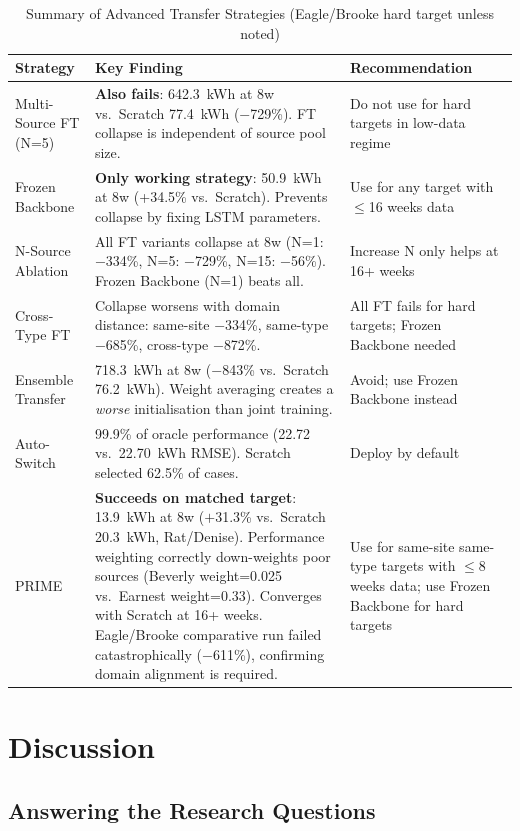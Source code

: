 \documentclass[12pt,a4paper]{report}
\begin{document}
\begin{table}[H]
\centering
\caption{Summary of Advanced Transfer Strategies (Eagle/Brooke hard target unless noted)}
\small
\begin{tabular}{p{3.0cm}p{5.5cm}p{5cm}}
\toprule
\textbf{Strategy} & \textbf{Key Finding} & \textbf{Recommendation} \\
\midrule
Multi-Source FT (N=5) & \textbf{Also fails}: 642.3~kWh at 8w vs.\ Scratch 77.4~kWh ($-$729\%). FT collapse is independent of source pool size. & Do not use for hard targets in low-data regime \\
\midrule
Frozen Backbone & \textbf{Only working strategy}: 50.9~kWh at 8w (+34.5\% vs.\ Scratch). Prevents collapse by fixing LSTM parameters. & Use for any target with $\leq$16 weeks data \\
\midrule
N-Source Ablation & All FT variants collapse at 8w (N=1: $-$334\%, N=5: $-$729\%, N=15: $-$56\%). Frozen Backbone (N=1) beats all. & Increase N only helps at 16+ weeks \\
\midrule
Cross-Type FT & Collapse worsens with domain distance: same-site $-$334\%, same-type $-$685\%, cross-type $-$872\%. & All FT fails for hard targets; Frozen Backbone needed \\
\midrule
Ensemble Transfer & 718.3~kWh at 8w ($-$843\% vs.\ Scratch 76.2~kWh). Weight averaging creates a \textit{worse} initialisation than joint training. & Avoid; use Frozen Backbone instead \\
\midrule
Auto-Switch & 99.9\% of oracle performance (22.72 vs.\ 22.70~kWh RMSE). Scratch selected 62.5\% of cases. & Deploy by default \\
\midrule
PRIME & \textbf{Succeeds on matched target}: 13.9~kWh at 8w ($+$31.3\% vs.\ Scratch 20.3~kWh, Rat/Denise). Performance weighting correctly down-weights poor sources (Beverly weight=0.025 vs.\ Earnest weight=0.33). Converges with Scratch at 16+ weeks. Eagle/Brooke comparative run failed catastrophically ($-$611\%), confirming domain alignment is required. & Use for same-site same-type targets with $\leq$8 weeks data; use Frozen Backbone for hard targets \\
\bottomrule
\end{tabular}
\end{table}

\chapter{Discussion}

\section{Answering the Research Questions}
\end{document}
